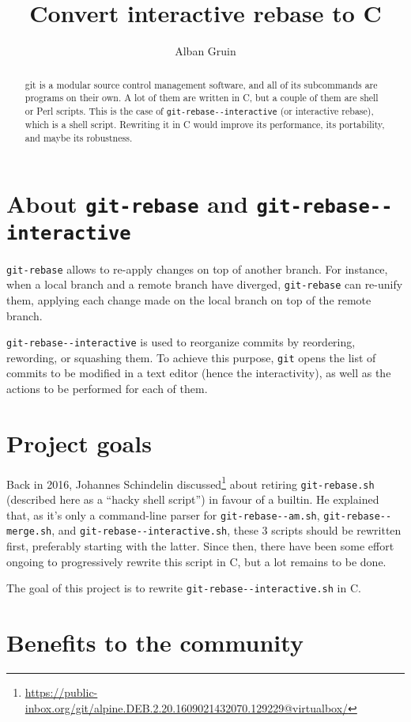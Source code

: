 \documentclass[11pt]{article}
\author{Alban Gruin}
\date{}
\title{Convert interactive rebase to C}
\begin{document}
\maketitle
\begin{abstract}
git is a modular source control management software, and all of its
subcommands are programs on their own. A lot of them are written in C,
but a couple of them are shell or Perl scripts. This is the case of
\texttt{git-rebase-{}-interactive} (or interactive rebase), which is a shell
script. Rewriting it in C would improve its performance, its
portability, and maybe its robustness.
\end{abstract}

\section{About \texttt{git-rebase} and \texttt{git-rebase-{}-interactive}}
\label{sec:org5a10d6a}
\texttt{git-rebase} allows to re-apply changes on top of another branch. For
instance, when a local branch and a remote branch have diverged,
\texttt{git-rebase} can re-unify them, applying each change made on the
local branch on top of the remote branch.

\texttt{git-rebase-{}-interactive} is used to reorganize commits by reordering,
rewording, or squashing them. To achieve this purpose, \texttt{git} opens the
list of commits to be modified in a text editor (hence the
interactivity), as well as the actions to be performed for each of
them.

\section{Project goals}
\label{sec:orgd8da98d}
Back in 2016, Johannes Schindelin discussed\footnote{\url{https://public-inbox.org/git/alpine.DEB.2.20.1609021432070.129229@virtualbox/}\label{orgc567bc2}} about retiring
\texttt{git-rebase.sh} (described here as a “hacky shell script”) in favour
of a builtin. He explained that, as it’s only a command-line parser
for \texttt{git-rebase-{}-am.sh}, \texttt{git-rebase-{}-merge.sh}, and
\texttt{git-rebase-{}-interactive.sh}, these 3 scripts should be rewritten
first, preferably starting with the latter. Since then, there have
been some effort ongoing to progressively rewrite this script in C,
but a lot remains to be done.

The goal of this project is to rewrite \texttt{git-rebase-{}-interactive.sh} in
C.

\section{Benefits to the community}
\label{sec:orgac6bb12}
\end{document}
